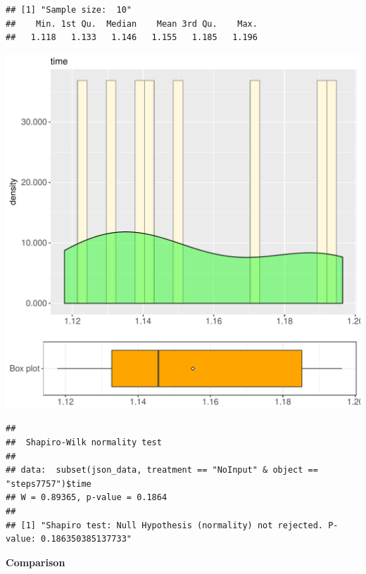 \documentclass{article}\usepackage[]{graphicx}\usepackage[]{color}
\makeatletter
\def\maxwidth{ %
  \ifdim\Gin@nat@width>\linewidth
    \linewidth
  \else
    \Gin@nat@width
  \fi
}
\newenvironment{kframe}{%
 \def\at@end@of@kframe{}%
 \ifinner\ifhmode%
  \def\at@end@of@kframe{\end{minipage}}%
  \begin{minipage}{\columnwidth}%
 \fi\fi%
 \def\FrameCommand##1{\hskip\@totalleftmargin \hskip-\fboxsep
 \colorbox{shadecolor}{##1}\hskip-\fboxsep
     \hskip-\linewidth \hskip-\@totalleftmargin \hskip\columnwidth}%
 \MakeFramed {\advance\hsize-\width
   \@totalleftmargin\z@ \linewidth\hsize
   \@setminipage}}%
 {\par\unskip\endMakeFramed%
 \at@end@of@kframe}
\newenvironment{knitrout}{}{} %
\makeatother
\begin{document}
\begin{knitrout}
\color{fgcolor}\begin{kframe}
\begin{verbatim}
## [1] "Sample size:  10"
##    Min. 1st Qu.  Median    Mean 3rd Qu.    Max. 
##   1.118   1.133   1.146   1.155   1.185   1.196
\end{verbatim}
\end{kframe}
\includegraphics[width=\maxwidth]{figure/RH4_NoInput_steps7757-1} 
\begin{kframe}\begin{verbatim}
## 
## 	Shapiro-Wilk normality test
## 
## data:  subset(json_data, treatment == "NoInput" & object == "steps7757")$time
## W = 0.89365, p-value = 0.1864
## 
## [1] "Shapiro test: Null Hypothesis (normality) not rejected. P-value: 0.186350385137733"
\end{verbatim}
\end{kframe}
\end{knitrout}
  
 \textbf{Comparison}
  
\end{document}
